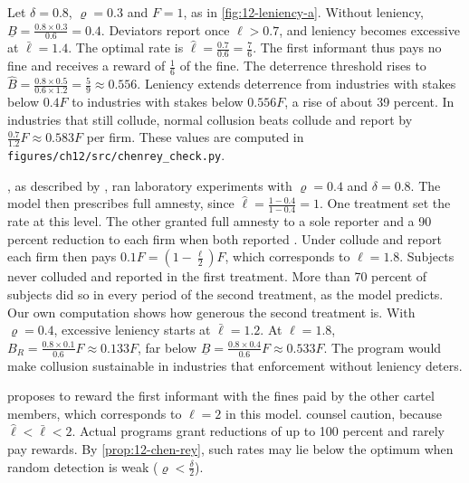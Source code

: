 \begin{example}\label{ex:12-leniency-numbers}
Let $\delta = 0.8$, $\varrho = 0.3$ and $F = 1$, as in \cref{fig:12-leniency-a}. Without leniency,
$\underline B = \frac{0.8 \times 0.3}{0.6} = 0.4$. Deviators report once $\ell > 0.7$, and leniency becomes excessive
at $\bar\ell = 1.4$. The optimal rate is $\hat\ell = \frac{0.7}{0.6} = \frac{7}{6}$. The first informant thus pays no
fine and receives a reward of $\frac{1}{6}$ of the fine. The deterrence threshold rises to
$\hat B = \frac{0.8 \times 0.5}{0.6 \times 1.2} = \frac{5}{9} \approx 0.556$. Leniency extends deterrence from
industries with stakes below $0.4F$ to industries with stakes below $0.556F$, a rise of about 39 percent. In
industries that still collude, normal collusion beats collude and report by $\frac{0.7}{1.2}F \approx 0.583F$ per
firm. These values are computed in \texttt{figures/ch12/src/chenrey\_check.py}.
\end{example}

\citet{HinloopenSoetevent2008}, as described by \citet[p.~13]{ChenRey2013}, ran laboratory experiments with
$\varrho = 0.4$ and $\delta = 0.8$. The model then prescribes full amnesty, since $\hat\ell = \frac{1 - 0.4}{1 - 0.4} = 1$.
One treatment set the rate at this level. The other granted full amnesty to a sole reporter and a 90 percent
reduction to each firm when both reported \citep[footnote~14]{ChenRey2013}. Under collude and report each firm then
pays $0.1F = (1 - \frac{\ell}{2})F$, which corresponds to $\ell = 1.8$. Subjects never colluded and reported in the
first treatment. More than 70 percent of subjects did so in every period of the second treatment, as the model
predicts. Our own computation shows how generous the second treatment is. With $\varrho = 0.4$, excessive leniency
starts at $\bar\ell = 1.2$. At $\ell = 1.8$, $B_R = \frac{0.8 \times 0.1}{0.6}F \approx 0.133F$, far below
$\underline B = \frac{0.8 \times 0.4}{0.6}F \approx 0.533F$. The program would make collusion sustainable in industries
that enforcement without leniency deters.

\citet{Spagnolo2004} proposes to reward the first informant with the fines paid by the other cartel members, which
corresponds to $\ell = 2$ in this model. \citet[p.~13]{ChenRey2013} counsel caution, because $\hat\ell < \bar\ell < 2$.
Actual programs grant reductions of up to 100 percent and rarely pay rewards. By \cref{prop:12-chen-rey}, such rates
may lie below the optimum when random detection is weak ($\varrho < \frac{\delta}{2}$).

